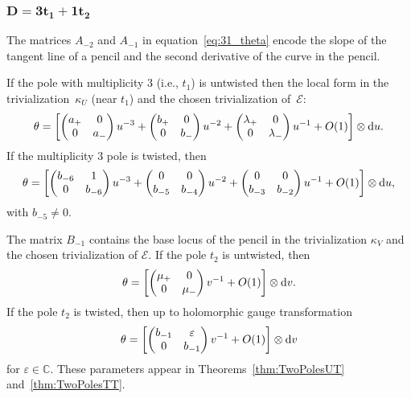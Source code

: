 \documentclass[pdftex]{sigma}
\newcommand{\C}{{\mathbb C}} %
\newcommand{\E}{{\mathcal E}} %
\renewcommand{\t}{\theta} %
\renewcommand{\d}{{\rm d}} %
\numberwithin{equation}{section}
\begin{document}
\subsubsection[$D=3t_1+1t_2$]{$\boldsymbol{D=3t_1+1t_2}$}\label{sssec:31}
The matrices $A_{-2}$ and $A_{-1}$ in equation~\eqref{eq:31_theta}
encode the slope of the tangent line of a pencil and the second
derivative of the curve in the pencil.

If the pole with multiplicity $3$ (i.e., $t_1$) is untwisted then the local form
in the trivializa\-tion~$\kappa_U$ (near $t_1$) and the chosen trivialization of~$\E$:
\begin{gather*}
 \t = \left[ \begin{pmatrix}
 a_+ & 0 \\
 0 & a_-
 \end{pmatrix} u^{-3}
				+
				\begin{pmatrix}
 b_+ & 0 \\
 0 & b_-
 \end{pmatrix} u^{-2}
				+
				\begin{pmatrix}
 \lambda_+ & 0 \\
 0 & \lambda_-
 \end{pmatrix} u^{-1}
				+ O(1)
 \right] \otimes \d u.
\end{gather*}
If the multiplicity $3$ pole is twisted, then
\begin{gather*}
 \t = \left[ \begin{pmatrix}
 b_{-6} & 1 \\
 0	& b_{-6}
 \end{pmatrix} u^{-3}
 +
 \begin{pmatrix}
 0 & 0 \\
 b_{-5} & b_{-4}
 \end{pmatrix} u^{-2}
 +
 \begin{pmatrix}
 0 & 0 \\
 b_{-3} & b_{-2}
 \end{pmatrix} u^{-1}
 + O(1)
 \right] \otimes \d u,
\end{gather*}
{with $b_{-5} \neq 0$.}

The matrix $B_{-1}$ contains the base locus of the pencil in the
trivialization $\kappa_V$ and the chosen trivialization of $\E$. If the pole $t_2$ is untwisted, then
\begin{gather*}
 \t = \left[ \begin{pmatrix}
 \mu_+ & 0 \\
 0 & \mu_-
 \end{pmatrix} v^{-1} + O(1)
 \right] \otimes \d v.
 \end{gather*}
If the pole $t_2$ is twisted, then up to holomorphic gauge transformation
\begin{gather*}
 \t = \left[ \begin{pmatrix}
 b_{-1} & \varepsilon \\
 0	& b_{-1}
 \end{pmatrix} v^{-1}
 + O(1)
 \right] \otimes \d v
\end{gather*}
for $\varepsilon \in \C$.
These parameters appear in Theorems~\ref{thm:TwoPolesUT} and~\ref{thm:TwoPolesTT}.
\end{document}

